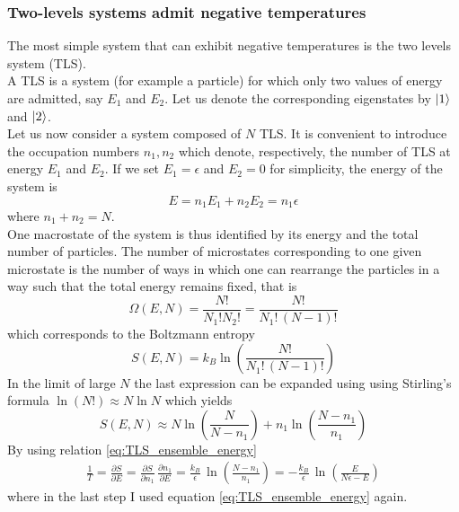 \subsubsection*{Two-levels systems admit negative temperatures}
The most simple system that can exhibit negative temperatures is the two levels system (TLS). \\
A TLS is a system (for example a particle) for which only two values of energy are admitted, say $E_1$ and $E_2$. Let us denote the 
corresponding eigenstates by $\left| 1 \right\rangle$ and $\left| 2 \right\rangle$. \\
Let us now consider a system composed of $N$ TLS. It is convenient to introduce the occupation numbers $n_1, n_2$ which denote,
respectively, the number of TLS at energy $E_1$ and $E_2$. If we set $E_1=\epsilon$ and $E_2=0$ for simplicity, the energy of the system is
\begin{equation}
    E = n_1 E_1 + n_2 E_2 = n_1\epsilon
    \label{eq:TLS_ensemble_energy}
\end{equation}
where $n_1 + n_2 = N$. \\
One macrostate of the system is thus identified by its energy and the total number of particles. The number of microstates corresponding 
to one given microstate is the number of ways in which one can rearrange the particles in a way such that the total energy remains fixed, that is 
\begin{equation*}
    \Omega(E, N) = \frac{N!}{N_1!N_2!} = \frac{N!}{N_1! \, (N-1)!}
\end{equation*}
which corresponds to the Boltzmann entropy 
\begin{equation}
    S(E, N) = k_B\ln\left(\frac{N!}{N_1! \, (N-1)!}\right)
    \label{eq:TLS_entropy_N}
\end{equation}
In the limit of large $N$ the last expression can be expanded using using Stirling's formula $\ln(N!) \approx N\ln N$ which yields 
\begin{equation*}
    S(E, N) \approx N \ln \left(\frac{N}{N-n_1}\right) + n_1 \ln\left(\frac{N-n_1}{n_1}\right)
\end{equation*}
By using relation \ref{eq:TLS_ensemble_energy}
\begin{gather*}
    \frac{1}{T} = \frac{\partial S}{\partial E} = \frac{\partial S}{\partial n_1} \, \frac{\partial n_1}{\partial E} =
    \frac{k_B}{\epsilon} \, \ln\left(\frac{N - n_1}{n_1}\right) = -\frac{k_B}{\epsilon} \, \ln\left(\frac{E}{N\epsilon - E}\right)
\end{gather*}
where in the last step I used equation \ref{eq:TLS_ensemble_energy} again. \\
